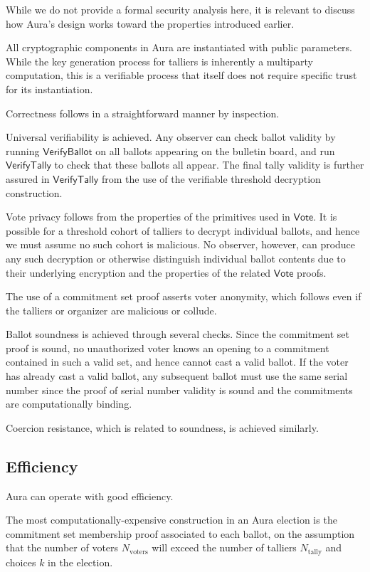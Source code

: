 \documentclass{article}
\newcommand{\func}[1]{\mathsf{#1}}
\begin{document}
While we do not provide a formal security analysis here, it is relevant to discuss how Aura's design works toward the properties introduced earlier.

All cryptographic components in Aura are instantiated with public parameters.
While the key generation process for talliers is inherently a multiparty computation, this is a verifiable process that itself does not require specific trust for its instantiation.

Correctness follows in a straightforward manner by inspection.

Universal verifiability is achieved.
Any observer can check ballot validity by running $\func{VerifyBallot}$ on all ballots appearing on the bulletin board, and run $\func{VerifyTally}$ to check that these ballots all appear.
The final tally validity is further assured in $\func{VerifyTally}$ from the use of the verifiable threshold decryption construction.

Vote privacy follows from the properties of the primitives used in $\func{Vote}$.
It is possible for a threshold cohort of talliers to decrypt individual ballots, and hence we must assume no such cohort is malicious.
No observer, however, can produce any such decryption or otherwise distinguish individual ballot contents due to their underlying encryption and the properties of the related $\func{Vote}$ proofs.

The use of a commitment set proof asserts voter anonymity, which follows even if the talliers or organizer are malicious or collude.

Ballot soundness is achieved through several checks.
Since the commitment set proof is sound, no unauthorized voter knows an opening to a commitment contained in such a valid set, and hence cannot cast a valid ballot.
If the voter has already cast a valid ballot, any subsequent ballot must use the same serial number since the proof of serial number validity is sound and the commitments are computationally binding.

Coercion resistance, which is related to soundness, is achieved similarly.


\subsection{Efficiency}

Aura can operate with good efficiency.

The most computationally-expensive construction in an Aura election is the commitment set membership proof associated to each ballot, on the assumption that the number of voters $N_{\text{voters}}$ will exceed the number of talliers $N_{\text{tally}}$ and choices $k$ in the election.
\end{document}
